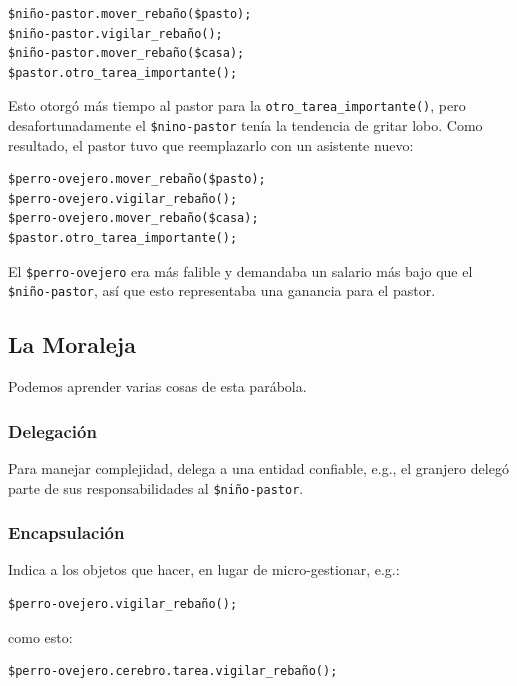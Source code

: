 \begin{verbatim}
$niño-pastor.mover_rebaño($pasto);
$niño-pastor.vigilar_rebaño();
$niño-pastor.mover_rebaño($casa);
$pastor.otro_tarea_importante();
\end{verbatim}

Esto otorgó más tiempo al pastor para la
\verb|otro_tarea_importante()|, pero desafortunadamente
el \verb|$nino-pastor| tenía la tendencia de gritar lobo.
Como resultado, el pastor tuvo que reemplazarlo con un 
asistente nuevo:

\begin{verbatim}
$perro-ovejero.mover_rebaño($pasto);
$perro-ovejero.vigilar_rebaño();
$perro-ovejero.mover_rebaño($casa);
$pastor.otro_tarea_importante();
\end{verbatim}

El \verb|$perro-ovejero| era más falible y demandaba 
un salario más bajo que el \verb|$niño-pastor|, así que
esto representaba una ganancia para el pastor.

\subsection{La Moraleja}

Podemos aprender varias cosas de esta parábola.

\subsubsection{Delegación}

Para manejar complejidad, delega a una entidad confiable, e.g.,
el granjero delegó parte de sus responsabilidades al \verb|$niño-pastor|.

\subsubsection{Encapsulación}

Indica a los objetos que hacer, en lugar de micro-gestionar, e.g.:

\begin{verbatim}
$perro-ovejero.vigilar_rebaño();
\end{verbatim}

como esto:

\begin{verbatim}
$perro-ovejero.cerebro.tarea.vigilar_rebaño();
\end{verbatim}

